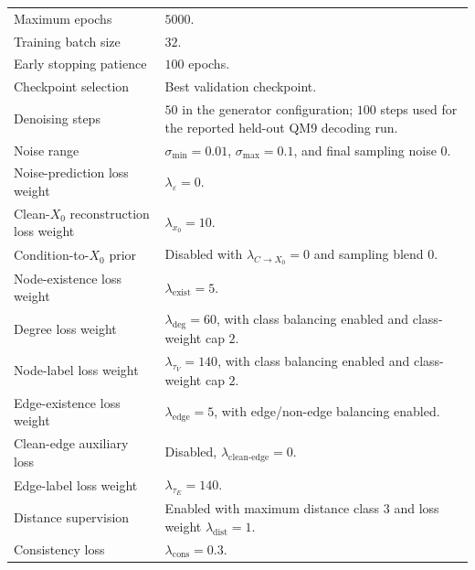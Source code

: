 \begin{xltabular}{\textwidth}{@{}p{0.34\textwidth}X@{}}
Maximum epochs &
\(5000\). \\

Training batch size &
\(32\). \\

Early stopping patience &
\(100\) epochs. \\

Checkpoint selection &
Best validation checkpoint. \\

Denoising steps &
\(50\) in the generator configuration; \(100\) steps used for the reported
held-out QM9 decoding run. \\

Noise range &
\(\sigma_{\min}=0.01\), \(\sigma_{\max}=0.1\), and final sampling noise \(0\). \\

Noise-prediction loss weight &
\(\lambda_{\varepsilon}=0\). \\

Clean-\(X_0\) reconstruction loss weight &
\(\lambda_{x_0}=10\). \\

Condition-to-\(X_0\) prior &
Disabled with \(\lambda_{C\rightarrow X_0}=0\) and sampling
blend \(0\). \\

Node-existence loss weight &
\(\lambda_{\mathrm{exist}}=5\). \\

Degree loss weight &
\(\lambda_{\mathrm{deg}}=60\), with class balancing enabled and class-weight
cap \(2\). \\

Node-label loss weight &
\(\lambda_{\tau_V}=140\), with class balancing enabled and
class-weight cap \(2\). \\

Edge-existence loss weight &
\(\lambda_{\mathrm{edge}}=5\), with edge/non-edge balancing enabled. \\

Clean-edge auxiliary loss &
Disabled, \(\lambda_{\mathrm{clean\text{-}edge}}=0\). \\

Edge-label loss weight &
\(\lambda_{\tau_E}=140\). \\

Distance supervision &
Enabled with maximum distance class \(3\) and loss weight
\(\lambda_{\mathrm{dist}}=1\). \\

Consistency loss &
\(\lambda_{\mathrm{cons}}=0.3\). \\


\end{xltabular}
